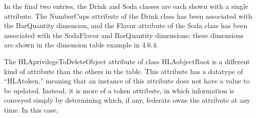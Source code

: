 In the final two entries, the Drink and Soda classes are each shown with a single attribute. The NumberCups attribute of the Drink class has been associated with the BarQuantity dimension, and the Flavor attribute of the Soda class has been associated with the SodaFlavor and BarQuantity dimensions; these dimensions are shown in the dimension table example in 4.6.4.

The HLAprivilegeToDeleteObject attribute of class HLAobjectRoot is a different kind of attribute than the others in the table. This attribute has a datatype of ``HLAtoken,'' meaning that an instance of this attribute does not have a value to be updated. Instead, it is more of a token attribute, in which information is conveyed simply by determining which, if any, federate owns the attribute at any time. In this case,

